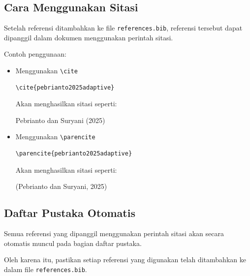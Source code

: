\subsection{Cara Menggunakan Sitasi}

Setelah referensi ditambahkan ke file \texttt{references.bib}, referensi
tersebut dapat dipanggil dalam dokumen menggunakan perintah sitasi.

Contoh penggunaan:

\begin{itemize}

\item Menggunakan \texttt{\textbackslash cite}

\begin{verbatim}
\cite{pebrianto2025adaptive}
\end{verbatim}

Akan menghasilkan sitasi seperti:

Pebrianto dan Suryani (2025)

\item Menggunakan \texttt{\textbackslash parencite}

\begin{verbatim}
\parencite{pebrianto2025adaptive}
\end{verbatim}

Akan menghasilkan sitasi seperti:

(Pebrianto dan Suryani, 2025)

\end{itemize}

\subsection{Daftar Pustaka Otomatis}

Semua referensi yang dipanggil menggunakan perintah sitasi akan secara
otomatis muncul pada bagian daftar pustaka.

Oleh karena itu, pastikan setiap referensi yang digunakan telah ditambahkan
ke dalam file \texttt{references.bib}.